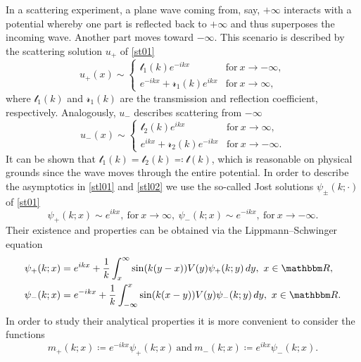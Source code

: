 In a scattering experiment, a plane wave coming from, say, $+\infty$ interacts
with a potential whereby one part is reflected back to $+\infty$ and thus superposes
the incoming wave. Another part moves toward $-\infty$.
This scenario is described by the scattering solution $u_+$ of \eqref{st01}
\begin{equation}\label{stl01}
  u_+(x) \sim
\begin{cases}
  \mathscr{t}_1(k) e^{-ikx}          & \text{for}\ x\to-\infty ,\\
  e^{-ikx} + \mathscr{r_1}(k) e^{ikx} & \text{for}\ x\to\infty ,
\end{cases}
\end{equation}
where $\mathscr{t}_1(k)$ and $\mathscr{r}_1(k)$ are the transmission and reflection coefficient,
respectively. Analogously, $u_-$ describes scattering from $-\infty$
\begin{equation}\label{stl02}
  u_-(x) \sim
\begin{cases}
  \mathscr{t}_2(k) e^{ikx}           & \text{for}\ x\to\infty ,\\
  e^{ikx} + \mathscr{r}_2(k) e^{-ikx} & \text{for}\ x\to-\infty .
\end{cases}
\end{equation}
It can be shown that $\mathscr{t}_1(k)=\mathscr{t}_2(k)\eqqcolon \mathscr{t}(k)$, which is reasonable on physical grounds since the wave
moves through the entire potential. In order to describe the asymptotics in \eqref{stl01} and \eqref{stl02}
we use the so-called Jost solutions $\psi_\pm(k;\cdot)$ of \eqref{st01}
\begin{equation}\label{stl03}
  \psi_+(k;x) \sim e^{ikx},\ \text{for}\ x\to\infty,\
  \psi_-(k;x) \sim e^{-ikx},\ \text{for}\ x\to-\infty .
\end{equation}
Their existence and properties can be obtained via the Lippmann--Schwinger equation
\begin{equation}\label{lippmann_schwinger}
\begin{aligned}
  \psi_+(k;x) & = e^{ikx} + \frac{1}{k}\int_x^\infty \sin(k(y-x)) V(y) \psi_+(k;y)\, dy,\ x\in\R ,\\
  \psi_-(k;x) & = e^{-ikx} + \frac{1}{k}\int_{-\infty}^x \sin(k(x-y)) V(y) \psi_-(k;y)\, dy,\ x\in\R .
\end{aligned}
\end{equation}
In order to study their analytical properties it is more convenient to consider the functions
\begin{equation}\label{stl03_modified}
  m_+(k;x) \coloneqq e^{-ikx}\psi_+(k;x)\ \text{and}\ m_-(k;x)\coloneqq e^{ikx}\psi_-(k;x) . 
\end{equation}
